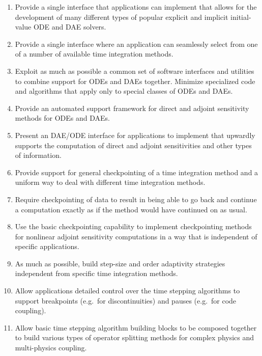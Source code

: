 \documentclass[pdf,ps2pdf,11pt]{SANDreport}
\begin{document}
\begin{enumerate}

{}\item Provide a single interface that applications can implement that allows
for the development of many different types of popular explicit and implicit
initial-value ODE and DAE solvers.

{}\item Provide a single interface where an application can seamlessly select
from one of a number of available time integration methods.

{}\item Exploit as much as possible a common set of software interfaces and
utilities to combine support for ODEs and DAEs together.  Minimize specialized
code and algorithms that apply only to special classes of ODEs and DAEs.

{}\item Provide an automated support framework for direct and adjoint
sensitivity methods for ODEs and DAEs.

{}\item Present an DAE/ODE interface for applications to implement that
upwardly supports the computation of direct and adjoint sensitivities and
other types of information.

{}\item Provide support for general checkpointing of a time integration method
and a uniform way to deal with different time integration methods.

{}\item Require checkpointing of data to result in being able to go back and
continue a computation exactly as if the method would have continued on as
usual.

{}\item Use the basic checkpointing capability to implement checkpointing
methods for nonlinear adjoint sensitivity computations in a way that is
independent of specific applications.

{}\item As much as possible, build step-size and order adaptivity strategies independent
from specific time integration methods.

{}\item Allow applications detailed control over the time stepping algorithms
to support breakpoints (e.g.\ for discontinuities) and pauses (e.g.\ for code coupling). 

{}\item Allow basic time stepping algorithm building blocks to be composed
together to build various types of operator splitting methods for complex
physics and multi-physics coupling.


\end{enumerate}
\end{document}
